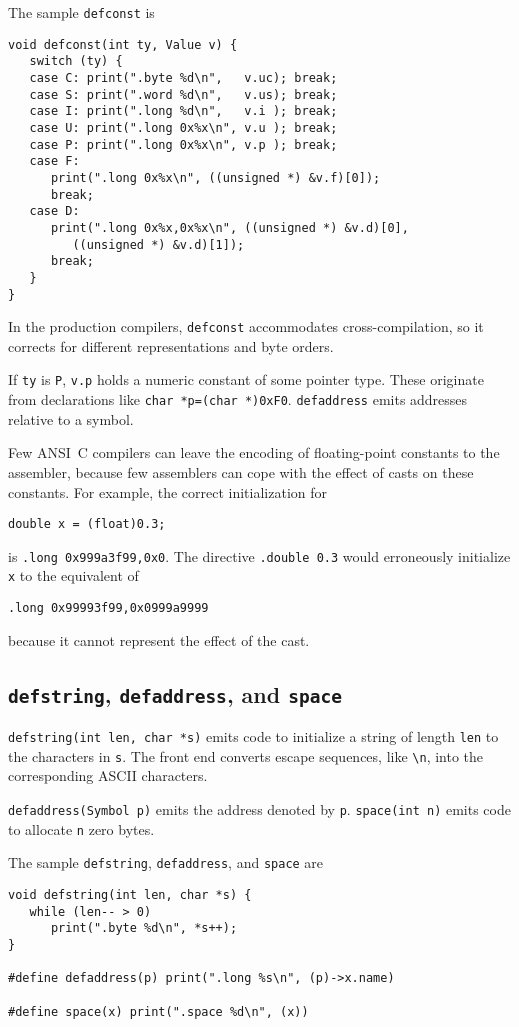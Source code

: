 The sample \verb|defconst| is
\begin{verbatim}
void defconst(int ty, Value v) {
   switch (ty) {
   case C: print(".byte %d\n",   v.uc); break;
   case S: print(".word %d\n",   v.us); break;
   case I: print(".long %d\n",   v.i ); break;
   case U: print(".long 0x%x\n", v.u ); break;
   case P: print(".long 0x%x\n", v.p ); break;
   case F:
      print(".long 0x%x\n", ((unsigned *) &v.f)[0]);
      break;
   case D: 
      print(".long 0x%x,0x%x\n", ((unsigned *) &v.d)[0],
         ((unsigned *) &v.d)[1]);
      break;
   }
}
\end{verbatim}
In the production compilers, \verb|defconst| accommodates cross-compilation,
so it corrects for different representations and byte orders.

If \verb|ty| is \verb|P|, \verb|v.p| holds a numeric constant of some pointer type.
These originate from declarations like \verb|char *p=(char *)0xF0|.
\verb|defaddress| emits addresses relative to a symbol.

Few ANSI~C compilers can leave the encoding of floating-point constants
to the assembler, because few assemblers can cope with the effect of
casts on these constants.  For example, the correct initialization for
\begin{verbatim}
double x = (float)0.3;
\end{verbatim}
is \verb|.long 0x999a3f99,0x0|.
The directive \verb|.double 0.3| would erroneously initialize \verb|x|
to the equivalent of
\begin{verbatim}
.long 0x99993f99,0x0999a9999
\end{verbatim}
because it cannot represent the effect of the cast.


\subsection{{\tt defstring}, {\tt defaddress}, and \tt space}

\label{defstring}
\label{defaddress}
\label{space}

\verb|defstring(int len, char *s)| emits code to initialize
a string of length \verb|len| to the characters in \verb|s|.
The front end converts escape sequences, like \verb|\n|, into
the corresponding ASCII characters.

\verb|defaddress(Symbol p)| emits the address denoted by \verb|p|.
\verb|space(int n)| emits code to allocate \verb|n| zero bytes.

The sample \verb|defstring|, \verb|defaddress|, and \verb|space| are
\begin{verbatim}
void defstring(int len, char *s) {
   while (len-- > 0)
      print(".byte %d\n", *s++);
}

#define defaddress(p) print(".long %s\n", (p)->x.name)

#define space(x) print(".space %d\n", (x))
\end{verbatim}


